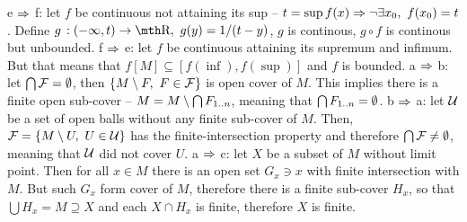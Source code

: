 \smallskip
e $\Rightarrow$ f: let $f$ be continuous not attaining its sup -- $t=\sup f(x) 
\Rightarrow \neg \exists x_0,\ f(x_0) = t$. Define $g\,:(-\infty,t)\to \R,\ 
g(y)=1/(t-y)$, $g$ is continous, $g\circ f$ is continous but unbounded.
\smallskip
f $\Rightarrow$ e: let $f$ be continuous attaining its supremum and infimum. 
But that means that $f[M] \subseteq [f(\inf),f(\sup)]$ and $f$ is bounded.
\smallskip
a $\Rightarrow$ b: let $\bigcap {\cal F} = \emptyset$, then $\{M\setminus F,\ F\in {\cal F}\}$ 
is open cover of $M$. This implies there is a finite open sub-cover -- 
$M = M \setminus \bigcap F_{1..n}$, meaning that $\bigcap F_{1..n} = \emptyset$.
\smallskip
b $\Rightarrow$ a: let $\cal U$ be a set of open balls without any finite sub-cover
of $M$. Then, ${\cal F} = \{M\setminus U,\ U\in{\cal U}\}$ has the 
finite-intersection property and therefore $\bigcap \cal F \neq \emptyset$, meaning 
that $\cal U$ did not cover $U$.
\smallskip
a $\Rightarrow$ c: let $X$ be a subset of $M$ without limit point. Then for all 
$x\in M$ there is an open set $G_x\ni x$ with finite intersection with $M$.
But such $G_x$ form cover of $M$, therefore there is a finite sub-cover 
$H_x$, so that $\bigcup H_x = M \supseteq X$ and each $X\cap H_x$ is finite, 
therefore $X$ is finite.
